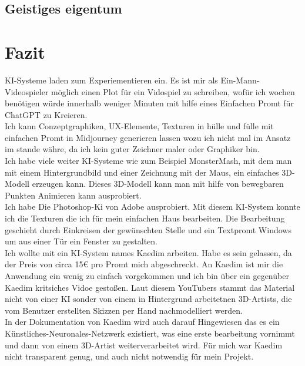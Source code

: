 \documentclass[10pt,a4paper,bibliography=totocnumbered,listof=totocnumbered]{scrartcl}
\begin{document}
\subsection{Geistiges eigentum}%

\section{Fazit}
KI-Systeme laden zum Experiementieren ein. Es ist mir als Ein-Mann-Videospieler möglich einen Plot für ein Vidospiel zu schreiben, wofür ich wochen benötigen würde innerhalb weniger Minuten mit hilfe eines Einfachen Promt für ChatGPT zu Kreieren.
\\
Ich kann Conzeptgraphiken, UX-Elemente, Texturen in hülle und fülle mit einfachen Promt in Midjourney generieren lassen wozu ich nicht mal im Ansatz im stande währe, da ich kein guter Zeichner maler oder Graphiker bin.
\\
Ich habe viele weiter KI-Systeme wie zum Beispiel MonsterMash, mit dem man mit einem Hintergrundbild und einer Zeichnung mit der Maus, ein einfaches 3D-Modell erzeugen kann. Dieses 3D-Modell kann man mit hilfe von bewegbaren Punkten Animieren kann ausprobiert.
\\
Ich habe Die Photoshop-Ki von Adobe ausprobiert. Mit diesem KI-System konnte ich die Texturen die ich für mein einfachen Haus bearbeiten. Die Bearbeitung geschieht durch Einkreisen der gewünschten Stelle und ein Textpromt Windows um aus einer Tür ein Fenster zu gestalten.
\\
Ich wollte mit ein KI-System names Kaedim arbeiten. Habe es sein gelassen, da der Preis von circa 15€ pro Promt mich abgeschreckt. An Kaedim ist mir die Anwendung ein wenig zu einfach vorgekommen und ich bin über ein gegenüber Kaedim kritsiches Vidoe gestoßen. Laut diesem YouTubers stammt das Material nicht von einer KI sonder von einem in Hintergrund arbeitetnen 3D-Artists, die vom Benutzer erstellten Skizzen per Hand nachmodelliert werden.
\\
In der Dokumentation von Kaedim wird auch darauf Hingewiesen das es ein Künstliches-Neuronales-Netzwerk existiert, was eine erste bearbeitung vornimmt und dann von einem 3D-Artist weiterverarbeitet wird. Für mich war Kaedim nicht transparent genug, und auch nicht notwendig für mein Projekt.
\end{document}
